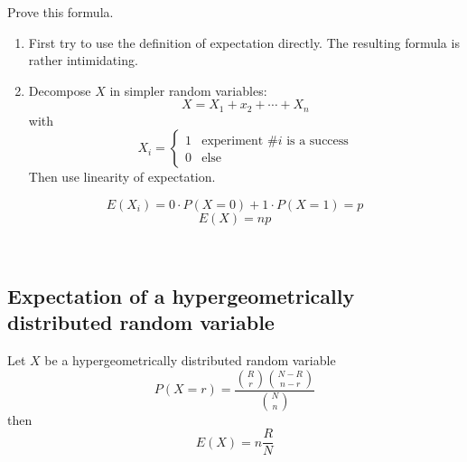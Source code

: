 \documentclass[twoside,11pt,a4paper]{article}
\newif\ifEN \ENtrue	                %
\def\tr|#1|#2|{\ifEN #2\else #1\fi}     %
\newenvironment{ttile}[1]{\begin{tcolorbox}[colback=tile,sharp corners,title=#1]}{\end{tcolorbox}}
\theoremstyle{definition}
\newcounter{exc}
\def\answerline#1{%
   \ifhmode\\[1ex]\fcolorbox{solbox}{solbox}{\hbox to \linewidth{\vbox to #1\baselineskip{}}}%
   \else\fcolorbox{solbox}{solbox}{\hbox to \linewidth{\vbox to #1\baselineskip{}}}%
   \fi
 }
\begin{document}
\begin{xxwrap}
  \begin{exc}
    \tr|Beweisen Sie obige Formel.| Prove this formula.|
    \begin{enumerate}
    \item \tr|Versuchen Sie zuerst direkt die Definition des Erwartungswertes anzuwenden.
              Dabei entsteht eine einschüchternde Formel.
             |First try to use the definition of expectation directly.
              The resulting formula is rather intimidating. |
    \item \tr|Zerlegen Sie $X$ in einfachere Zufallsvariabeln:|Decompose $X$ in simpler random variables:|
      \[
        X=X_1+x_2+\cdots+X_n
      \]
      \tr|mit|with|
      \[
        X_i=
        \begin{cases}
          1 & \text{\tr|Experiment \#$i$ ist ein Erfolg|experiment \#$i$ is a success|}\\
          0 & \text{\tr|sonst|else|}
        \end{cases}
      \]
      \tr|Verwenden Sie dann die Linearität des Erwartungswertes.|Then use linearity of expectation.|
    \end{enumerate}
  \end{exc}
  \begin{Answer}
   \[
   E(X_i)=0\cdot P(X=0) + 1 \cdot P(X=1) = p 
   \]
   \[
   E(X)=np
   \] 
  \end{Answer}
  \answerline{12}
\end{xxwrap}

\subsection{\tr|Erwartungswert einer hypergeometrisch verteilten Zufallsvariablen|Expectation of a hypergeometrically distributed random variable|}
\begin{ttile}{\tr|Erwartungswert einer hypergeometrisch verteilten Zufallsvariabeln |Expectation of a hypergeometrically distributed random variable|}
\tr|Sei $X$ eine hypergeometrisch  verteilte Zufallsvariable |Let $X$ be a hypergeometrically distributed random variable|
   \[
     P(X=r)=\frac{\binom Rr \binom {N-R}{n-r}}{\binom Nn}
   \]
\tr|dann gilt für ihren Erwartungswert |then|
\[
E(X)=n\frac RN
\]
\end{ttile}
\end{document}
